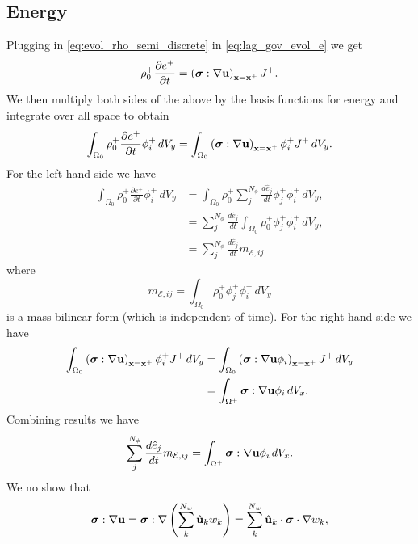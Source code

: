 \documentclass[11pt]{report}
\begin{document}
\subsection{Energy}
Plugging in \cref{eq:evol_rho_semi_discrete} in \cref{eq:lag_gov_evol_e} we get
\begin{equation}
    \rho^+_0 \frac{\partial e^+}{\partial t} = \left ( \bm \sigma : \nabla \mathbf{u} \right )_{\mathbf{x} = \mathbf{x}^+} J^+.
\end{equation}
We then multiply both sides of the above by the basis functions for energy and integrate over all space to obtain
\begin{equation}
    \int_{\Omega_0} \rho^+_0 \frac{\partial e^+}{\partial t} \phi_i^+ \, dV_y = \int_{\Omega_0} \left ( \bm \sigma : \nabla \mathbf{u} \right )_{\mathbf{x} = \mathbf{x}^+} \phi_i^+ J^+ \, dV_y.
\end{equation}
For the left-hand side we have
\begin{align}
    \int_{\Omega_0} \rho^+_0 \frac{\partial e^+}{\partial t} \phi_i^+ \, dV_y &= \int_{\Omega_0} \rho^+_0 \sum_j^{N_\phi} \frac{d \hat{e}_j}{dt} \phi_j^+ \phi_i^+ \, dV_y , \nonumber \\
    &= \sum_j^{N_\phi} \frac{d \hat{e}_j}{dt} \int_{\Omega_0} \rho^+_0 \phi_j^+ \phi_i^+ \, dV_y , \nonumber \\
    &= \sum_j^{N_\phi} \frac{d \hat{e}_j}{dt} m_{\mathcal{E},ij}
\end{align}
where
\begin{equation}
    m_{\mathcal{E},ij} = \int_{\Omega_0} \rho^+_0 \phi_j^+ \phi_i^+ \, dV_y
\end{equation}
is a mass bilinear form (which is independent of time). For the right-hand side we have
\begin{align}
    \int_{\Omega_0} \left ( \bm \sigma : \nabla \mathbf{u} \right )_{\mathbf{x} = \mathbf{x}^+} \phi_i^+ J^+ \, dV_y &= \int_{\Omega_0} \left ( \bm \sigma : \nabla \mathbf{u} \phi_i \right )_{\mathbf{x} = \mathbf{x}^+} J^+ \, dV_y \nonumber \\
    &= \int_{\Omega^+} \bm \sigma : \nabla \mathbf{u} \phi_i \, dV_x. 
\end{align}
Combining results we have
\begin{equation}
    \sum_j^{N_\phi} \frac{d \hat{e}_j}{dt} m_{\mathcal{E},ij} = \int_{\Omega^+} \bm \sigma : \nabla \mathbf{u} \phi_i \, dV_x.
\end{equation}
We no show that
\begin{equation}
    \bm \sigma : \nabla \mathbf{u} = \bm \sigma : \nabla \left ( \sum_k^{N_w} \hat{\mathbf{u}}_k w_k \right ) = \sum_k^{N_w} \hat{\mathbf{u}}_k \cdot \bm \sigma \cdot \nabla w_k,
\end{equation}
\end{document}
